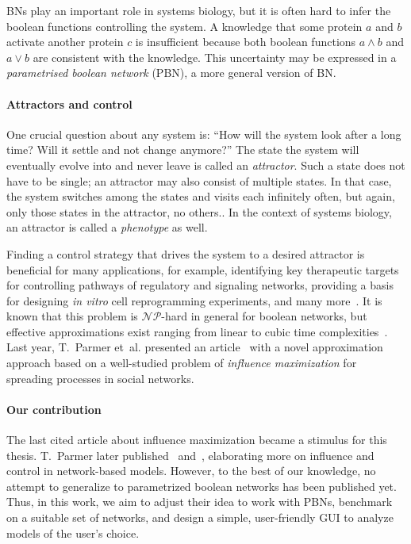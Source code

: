 \documentclass[
	digital, oneside, nosansbold, nocolorbold, nolot, nolof
]{fithesis4}
\theoremstyle{definition}
\theoremstyle{definition}
\begin{document}
BNs play an important role in systems biology, but it is often hard to infer
the boolean functions controlling the system. A knowledge that some protein
\(a\) and \(b\) activate another protein \(c\) is insufficient because both
boolean functions \(a \land b\) and \(a \lor b\) are consistent with the
knowledge. This uncertainty may be expressed in a \emph{parametrised boolean
network} (PBN), a more general version of BN.

\paragraph{Attractors and control}

One crucial question about any system is: \enquote{How will the system look
after a long time? Will it settle and not change anymore?} The state the system
will eventually evolve into and never leave is called an \emph{attractor}. Such
a state does not have to be single; an attractor may also consist of multiple
states. In that case, the system switches among the states and visits each
infinitely often, but again, only those states in the attractor, no others.. In
the context of systems biology, an attractor is called a \emph{phenotype} as
well.

Finding a control strategy that drives the system to a desired attractor is
beneficial for many applications, for example, identifying key therapeutic
targets for controlling pathways of regulatory and signaling networks,
providing a basis for designing \emph{in vitro} cell reprogramming experiments,
and many more~\cite{control_psbn}. It is known that this problem is
\(\mathcal{NP}\)-hard in general for boolean networks, but effective
approximations exist ranging from linear to cubic time
complexities~\cite{control_akutsu}. Last year, T.~Parmer et~al. presented an
article~\cite{infl_max_BN} with a novel approximation approach based on a
well-studied problem of \emph{influence maximization} for spreading processes
in social networks.

\paragraph{Our contribution}

The last cited article about influence maximization became a stimulus for this
thesis. T.~Parmer later published
\cite{parmer_dynamical}~and~\cite{parmer_phd}, elaborating more on influence
and control in network-based models. However, to the best of our knowledge, no
attempt to generalize to parametrized boolean networks has been published yet.
Thus, in this work, we aim to adjust their idea to work with PBNs, benchmark on
a suitable set of networks, and design a simple, user-friendly GUI to analyze
models of the user's choice.
\end{document}
